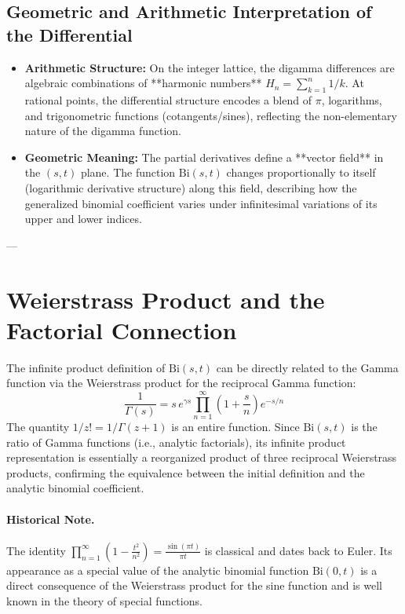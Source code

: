 \documentclass{article}
\newcommand{\Bi}{\mathrm{Bi}}
\newcommand{\eulergam}{\gamma} %
\begin{document}
\subsection{Geometric and Arithmetic Interpretation of the Differential}
\begin{itemize}
    \item \textbf{Arithmetic Structure:} On the integer lattice, the digamma differences are algebraic combinations of **harmonic numbers** $H_n = \sum_{k=1}^n 1/k$. At rational points, the differential structure encodes a blend of $\pi$, logarithms, and trigonometric functions (cotangents/sines), reflecting the non-elementary nature of the digamma function.
    \item \textbf{Geometric Meaning:} The partial derivatives define a **vector field** in the $(s,t)$ plane. The function $\Bi(s,t)$ changes proportionally to itself (logarithmic derivative structure) along this field, describing how the generalized binomial coefficient varies under infinitesimal variations of its upper and lower indices.
\end{itemize}

---

\section{Weierstrass Product and the Factorial Connection}

The infinite product definition of $\Bi(s,t)$ can be directly related to the Gamma function via the Weierstrass product for the reciprocal Gamma function:
$$
\frac{1}{\Gamma(s)} = s\, e^{\eulergam s} \prod_{n=1}^\infty \left(1 + \frac{s}{n}\right) e^{-s/n}
$$
The quantity $1/z! = 1/\Gamma(z+1)$ is an entire function. Since $\Bi(s,t)$ is the ratio of Gamma functions (i.e., analytic factorials), its infinite product representation is essentially a reorganized product of three reciprocal Weierstrass products, confirming the equivalence between the initial definition and the analytic binomial coefficient.

\paragraph{Historical Note.}
The identity $\prod_{n=1}^\infty \left(1 - \frac{t^2}{n^2}\right) = \frac{\sin(\pi t)}{\pi t}$ is classical and dates back to Euler. Its appearance as a special value of the analytic binomial function $\Bi(0,t)$ is a direct consequence of the Weierstrass product for the sine function and is well known in the theory of special functions.
\end{document}
